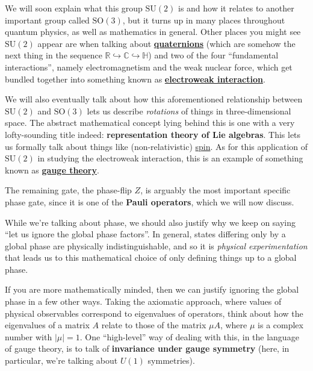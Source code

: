 \documentclass[fleqn]{article}
\newenvironment{technical}{\noindent}{\medskip}
\begin{document}
\begin{technical}
We will soon explain what this group \(\mathrm{SU}(2)\) is and how it relates to another important group called \(\mathrm{SO}(3)\), but it turns up in many places throughout quantum physics, as well as mathematics in general.
Other places you might see \(\mathrm{SU}(2)\) appear are when talking about \href{https://en.wikipedia.org/wiki/Quaternion}{\textbf{quaternions}} (which are somehow the next thing in the sequence \(\mathbb{R}\hookrightarrow\mathbb{C}\hookrightarrow\mathbb{H}\)) and two of the four ``fundamental interactions'', namely electromagnetism and the weak nuclear force, which get bundled together into something known as \href{https://en.wikipedia.org/wiki/Electroweak_interaction}{\textbf{electroweak interaction}}.

We will also eventually talk about how this aforementioned relationship between \(\mathrm{SU}(2)\) and \(\mathrm{SO}(3)\) lets us describe \emph{rotations} of things in three-dimensional space.
The abstract mathematical concept lying behind this is one with a very lofty-sounding title indeed: \textbf{representation theory of Lie algebras}.
This lets us formally talk about things like (non-relativistic) \href{https://en.wikipedia.org/wiki/Spin_(physics)}{spin}.
As for this application of \(\mathrm{SU}(2)\) in studying the electroweak interaction, this is an example of something known as \href{https://en.wikipedia.org/wiki/Gauge_theory}{\textbf{gauge theory}}.

\end{technical}

The remaining gate, the phase-flip \(Z\), is arguably the most important specific phase gate, since it is one of the \textbf{Pauli operators}, which we will now discuss.

While we're talking about phase, we should also justify why we keep on saying ``let us ignore the global phase factors''.
In general, states differing only by a global phase are physically indistinguishable, and so it is \emph{physical experimentation} that leads us to this mathematical choice of only defining things up to a global phase.

\begin{technical}
If you are more mathematically minded, then we can justify ignoring the global phase in a few other ways.
Taking the axiomatic approach, where values of physical observables correspond to eigenvalues of operators, think about how the eigenvalues of a matrix \(A\) relate to those of the matrix \(\mu A\), where \(\mu\) is a complex number with \(|\mu|=1\).
One ``high-level'' way of dealing with this, in the language of gauge theory, is to talk of \textbf{invariance under gauge symmetry} (here, in particular, we're talking about \href{https://en.wikipedia.org/wiki/Circle_group}{\(U(1)\)} symmetries).

\end{technical}
\end{document}
